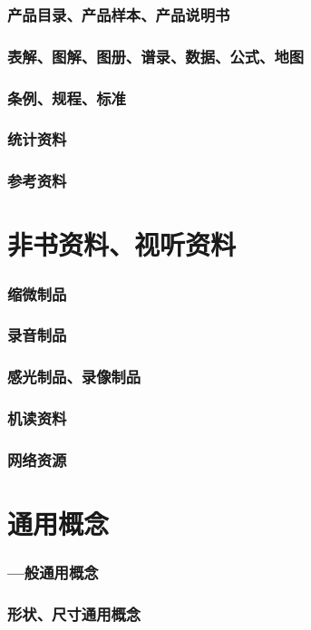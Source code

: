 \documentclass[UTF8]{../ApplicationUniverse}
\begin{document}
    \subsubsection{产品目录、产品样本、产品说明书}
    \subsubsection{表解、图解、图册、谱录、数据、公式、地图}
    \subsubsection{条例、规程、标准}
    \subsubsection{统计资料}
    \subsubsection{参考资料}
\section{非书资料、视听资料}
    \subsubsection{缩微制品}
    \subsubsection{录音制品}
    \subsubsection{感光制品、录像制品}
    \subsubsection{机读资料}
    \subsubsection{网络资源}
\section{通用概念}
    \subsubsection{—般通用概念}
    \subsubsection{形状、尺寸通用概念}
\end{document}
